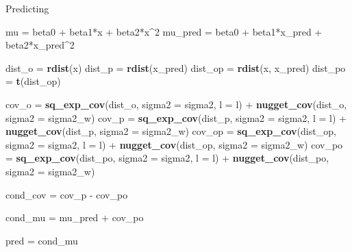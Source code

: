 \documentclass[11pt,ignorenonframetext,]{beamer}
\newenvironment{Shaded}{}{}
\newcommand{\KeywordTok}[1]{\textcolor[rgb]{0.00,0.44,0.13}{\textbf{#1}}}
\newcommand{\DataTypeTok}[1]{\textcolor[rgb]{0.56,0.13,0.00}{#1}}
\newcommand{\DecValTok}[1]{\textcolor[rgb]{0.25,0.63,0.44}{#1}}
\newcommand{\StringTok}[1]{\textcolor[rgb]{0.25,0.44,0.63}{#1}}
\newcommand{\OperatorTok}[1]{\textcolor[rgb]{0.40,0.40,0.40}{#1}}
\newcommand{\NormalTok}[1]{#1}
\let\oldShaded\Shaded
\let\endoldShaded\endShaded
\renewenvironment{Shaded}{\footnotesize\begin{spacing}{0.9}\oldShaded}{\endoldShaded\end{spacing}}
\begin{document}
\begin{frame}[fragile,t]{Predicting}
\begin{Shaded}
\begin{Highlighting}[]
{{{{{{\NormalTok{mu =}\StringTok{ }\NormalTok{beta0 }\OperatorTok{+}\StringTok{ }\NormalTok{beta1}\OperatorTok{*}\NormalTok{x }\OperatorTok{+}\StringTok{ }\NormalTok{beta2}\OperatorTok{*}\NormalTok{x}\OperatorTok{^}\DecValTok{2}
\NormalTok{mu_pred =}\StringTok{ }\NormalTok{beta0 }\OperatorTok{+}\StringTok{ }\NormalTok{beta1}\OperatorTok{*}\NormalTok{x_pred }\OperatorTok{+}\StringTok{ }\NormalTok{beta2}\OperatorTok{*}\NormalTok{x_pred}\OperatorTok{^}\DecValTok{2}

\NormalTok{dist_o =}\StringTok{ }\KeywordTok{rdist}\NormalTok{(x)}
\NormalTok{dist_p =}\StringTok{ }\KeywordTok{rdist}\NormalTok{(x_pred)}
\NormalTok{dist_op =}\StringTok{ }\KeywordTok{rdist}\NormalTok{(x, x_pred)}
\NormalTok{dist_po =}\StringTok{ }\KeywordTok{t}\NormalTok{(dist_op)}
  
\NormalTok{cov_o  =}\StringTok{ }\KeywordTok{sq_exp_cov}\NormalTok{(dist_o,  }\DataTypeTok{sigma2 =}\NormalTok{ sigma2, }\DataTypeTok{l =}\NormalTok{ l) }\OperatorTok{+}\StringTok{ }\KeywordTok{nugget_cov}\NormalTok{(dist_o, }\DataTypeTok{sigma2 =}\NormalTok{ sigma2_w)}
\NormalTok{cov_p  =}\StringTok{ }\KeywordTok{sq_exp_cov}\NormalTok{(dist_p,  }\DataTypeTok{sigma2 =}\NormalTok{ sigma2, }\DataTypeTok{l =}\NormalTok{ l) }\OperatorTok{+}\StringTok{ }\KeywordTok{nugget_cov}\NormalTok{(dist_p, }\DataTypeTok{sigma2 =}\NormalTok{ sigma2_w)}
\NormalTok{cov_op =}\StringTok{ }\KeywordTok{sq_exp_cov}\NormalTok{(dist_op, }\DataTypeTok{sigma2 =}\NormalTok{ sigma2, }\DataTypeTok{l =}\NormalTok{ l) }\OperatorTok{+}\StringTok{ }\KeywordTok{nugget_cov}\NormalTok{(dist_op, }\DataTypeTok{sigma2 =}\NormalTok{ sigma2_w)}
\NormalTok{cov_po =}\StringTok{ }\KeywordTok{sq_exp_cov}\NormalTok{(dist_po, }\DataTypeTok{sigma2 =}\NormalTok{ sigma2, }\DataTypeTok{l =}\NormalTok{ l) }\OperatorTok{+}\StringTok{ }\KeywordTok{nugget_cov}\NormalTok{(dist_po, }\DataTypeTok{sigma2 =}\NormalTok{ sigma2_w)}

\NormalTok{cond_cov =}\StringTok{ }\NormalTok{cov_p }\OperatorTok{-}\StringTok{ }\NormalTok{cov_po }\OperatorTok{%
\NormalTok{cond_mu  =}\StringTok{ }\NormalTok{mu_pred }\OperatorTok{+}\StringTok{ }\NormalTok{cov_po }\OperatorTok{%
  
\NormalTok{pred =}\StringTok{ }\NormalTok{cond_mu }\OperatorTok{%

}}}}}}}}}
\end{Highlighting}
\end{Shaded}
\end{frame}
\end{document}
